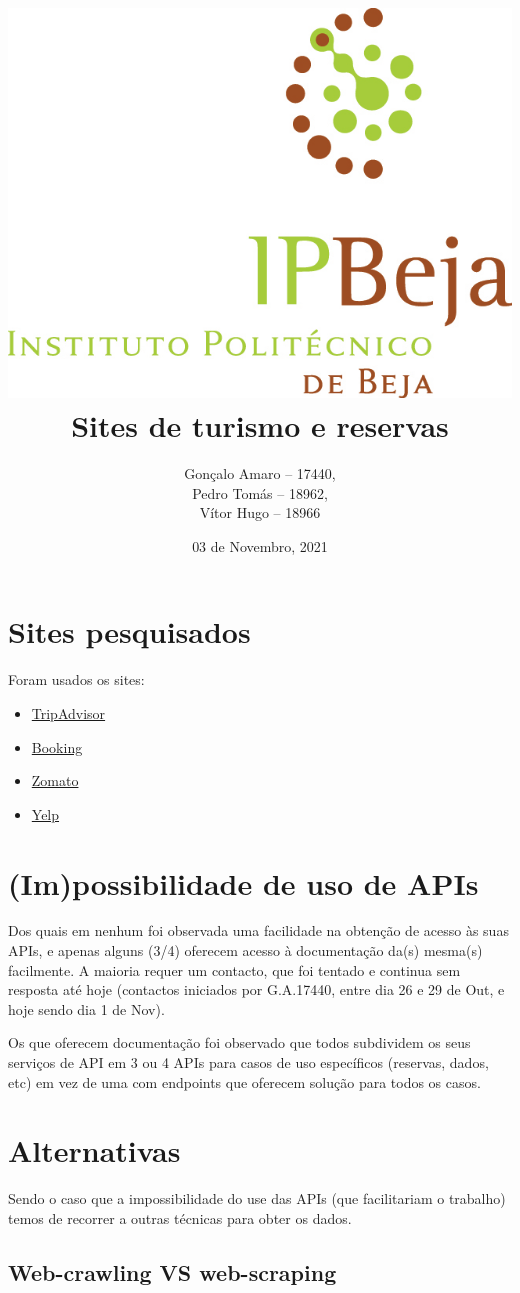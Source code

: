 \documentclass[a4paper,10pt]{article}
\title{\includegraphics[scale=0.5]{ipbeja_logo.png}\\[0.5cm]Sites de turismo e reservas} %
\author{Gonçalo Amaro -- 17440,\\ Pedro Tomás -- 18962,\\ Vítor Hugo -- 18966} %
\date{03 de Novembro, 2021} %
\begin{document}
\maketitle

\newpage

{
  \hypersetup{linkcolor=black}
  \tableofcontents
}

\newpage

\section{Sites pesquisados}

Foram usados os sites:
\begin{itemize}
    \item \href{https://www.tripadvisor.com/}{TripAdvisor}
    \item \href{https://www.booking.com/}{Booking}
    \item \href{https://www.zomato.com/}{Zomato}
    \item \href{https://www.yelp.com/}{Yelp}
\end{itemize}

\section{(Im)possibilidade de uso de APIs}

Dos quais em nenhum foi observada uma facilidade na obtenção de acesso às suas APIs, e apenas alguns (3/4) oferecem acesso à documentação da(s) mesma(s) facilmente.
A maioria requer um contacto, que foi tentado e continua sem resposta até hoje (contactos iniciados por G.A.17440, entre dia 26 e 29 de Out, e hoje sendo dia 1 de Nov).

Os que oferecem documentação foi observado que todos subdividem os seus serviços de API em 3 ou 4 APIs para casos de uso específicos (reservas, dados, etc) em vez de uma com endpoints que oferecem solução para todos os casos.

\section{Alternativas}

Sendo o caso que a impossibilidade do use das APIs (que facilitariam o trabalho) temos de recorrer a outras técnicas para obter os dados.

\subsection{Web-crawling VS web-scraping}
\end{document}
